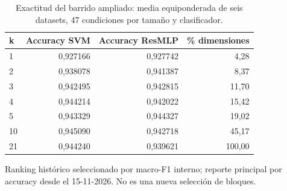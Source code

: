 \begin{table}[!htbp]\centering
\fontsize{9}{11}\selectfont\setlength{\tabcolsep}{4pt}
\caption{Exactitud del barrido ampliado: media equiponderada de seis datasets, 47 condiciones por tamaño y clasificador.}\label{tab:tm-curva}
\begin{tabular}{@{}lrrr@{}}\toprule
k & Accuracy SVM & Accuracy ResMLP & \% dimensiones\\\midrule
1 & 0,927166 & 0,927742 & 4,28\\
2 & 0,938078 & 0,941387 & 8,37\\
3 & 0,942495 & 0,942815 & 11,70\\
4 & 0,944214 & 0,942022 & 15,42\\
5 & 0,943329 & 0,944327 & 19,02\\
10 & 0,945090 & 0,942718 & 45,17\\
21 & 0,944240 & 0,939621 & 100,00\\
\bottomrule\end{tabular}
\par\smallskip\begin{minipage}{0.98\textwidth}\footnotesize Ranking histórico seleccionado por macro-F1 interno; reporte principal por accuracy desde el 15-11-2026. No es una nueva selección de bloques.\end{minipage}
\end{table}
